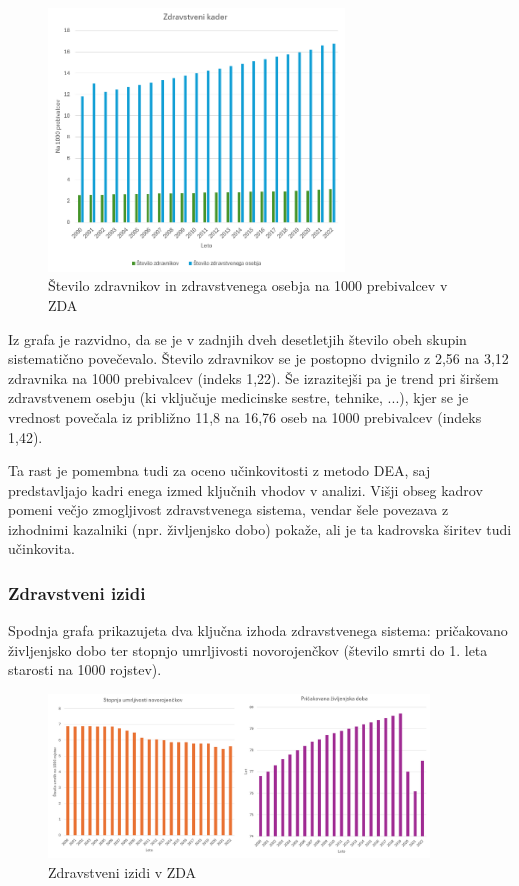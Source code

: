 \documentclass[12pt,a4paper]{article}
\theoremstyle{definition}
\begin{document}
\begin{figure}[htbp]
    \centering
    \includegraphics[width=0.7\textwidth]{zda_stevilo_zdravnikov.png}
    \caption{Število zdravnikov in zdravstvenega osebja na 1000 prebivalcev v ZDA}
    \label{fig:zda_stevilo_zdravnikov}
\end{figure}

Iz grafa je razvidno, da se je v zadnjih dveh desetletjih število obeh skupin sistematično povečevalo. 
Število zdravnikov se je postopno dvignilo z 2,56 na 3,12 zdravnika na 1000 prebivalcev (indeks 1,22). 
Še izrazitejši pa je trend pri širšem zdravstvenem osebju (ki vključuje medicinske sestre, tehnike, ...), 
kjer se je vrednost povečala iz približno 11,8 na 16,76 oseb na 1000 prebivalcev (indeks 1,42).

Ta rast je pomembna tudi za oceno učinkovitosti z metodo DEA, saj predstavljajo kadri enega izmed ključnih vhodov v analizi. 
Višji obseg kadrov pomeni večjo zmogljivost zdravstvenega sistema, vendar šele povezava z izhodnimi kazalniki 
(npr. življenjsko dobo) pokaže, ali je ta kadrovska širitev tudi učinkovita.

\subsubsection{Zdravstveni izidi}

Spodnja grafa prikazujeta dva ključna izhoda zdravstvenega sistema: 
pričakovano življenjsko dobo ter stopnjo umrljivosti novorojenčkov (število smrti do 1. leta starosti na 1000 rojstev).

\begin{figure}[htbp]
    \centering
    \includegraphics[width=0.9\textwidth]{zda_zdravstveni_izzidi.png}
    \caption{Zdravstveni izidi v ZDA}
    \label{fig:zda_zdravstveni_izzidi}
\end{figure}
\end{document}
